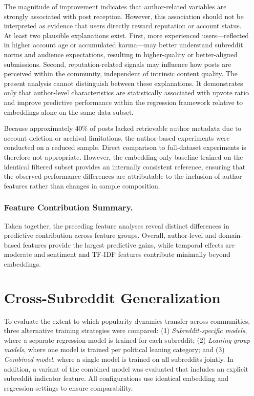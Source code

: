 The magnitude of improvement indicates that author-related variables are strongly associated with post reception. However, this association should not be interpreted as evidence that users directly reward reputation or account status. At least two plausible explanations exist. First, more experienced users—reflected in higher account age or accumulated karma—may better understand subreddit norms and audience expectations, resulting in higher-quality or better-aligned submissions. Second, reputation-related signals may influence how posts are perceived within the community, independent of intrinsic content quality. The present analysis cannot distinguish between these explanations. It demonstrates only that author-level characteristics are statistically associated with upvote ratio and improve predictive performance within the regression framework relative to embeddings alone on the same data subset.

Because approximately 40\% of posts lacked retrievable author metadata due to account deletion or archival limitations, the author-based experiments were conducted on a reduced sample. Direct comparison to full-dataset experiments is therefore not appropriate. However, the embedding-only baseline trained on the identical filtered subset provides an internally consistent reference, ensuring that the observed performance differences are attributable to the inclusion of author features rather than changes in sample composition.

\subsubsection*{Feature Contribution Summary.}

Taken together, the preceding feature analyses reveal distinct differences in predictive contribution across feature groups. Overall, author-level and domain-based features provide the largest predictive gains, while temporal effects are moderate and sentiment and TF-IDF features contribute minimally beyond embeddings.

\section{Cross-Subreddit Generalization}

To evaluate the extent to which popularity dynamics transfer across communities, three alternative training strategies were compared: (1) \textit{Subreddit-specific models}, where a separate regression model is trained for each subreddit; (2) \textit{Leaning-group models}, where one model is trained per political leaning category; and (3) \textit{Combined model}, where a single model is trained on all subreddits jointly. In addition, a variant of the combined model was evaluated that includes an explicit subreddit indicator feature. All configurations use identical embedding and regression settings to ensure comparability.



